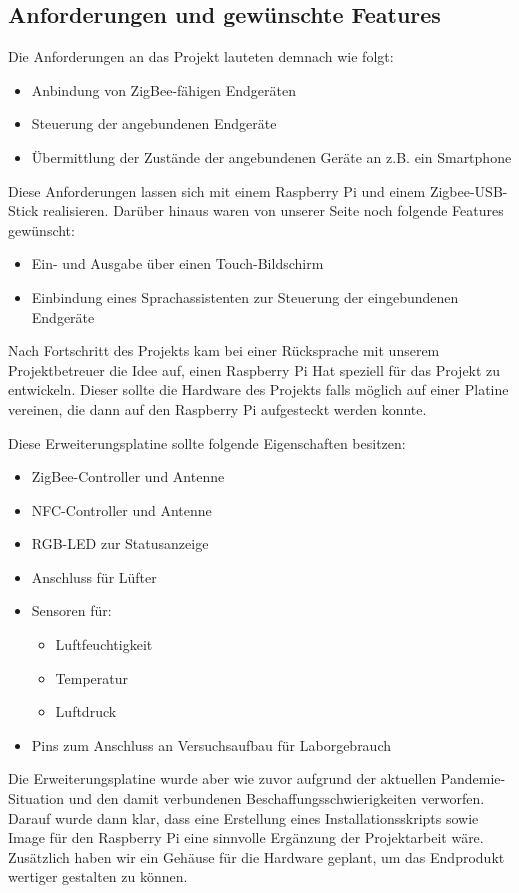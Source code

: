 \subsection{Anforderungen und gewünschte Features}\label{zs_anforderungen}
Die Anforderungen an das Projekt lauteten demnach wie folgt:
\begin{itemize}
	\item Anbindung von ZigBee-fähigen Endgeräten
	\item Steuerung der angebundenen Endgeräte
	\item Übermittlung der Zustände der angebundenen Geräte an z.B. ein Smartphone
\end{itemize}
Diese Anforderungen lassen sich mit einem Raspberry Pi und einem Zigbee-USB-Stick realisieren. Darüber hinaus waren von unserer Seite noch folgende Features gewünscht:
\begin{itemize}
	\item Ein- und Ausgabe über einen Touch-Bildschirm
	\item Einbindung eines Sprachassistenten zur Steuerung der eingebundenen Endgeräte
\end{itemize}
Nach Fortschritt des Projekts kam bei einer Rücksprache mit unserem Projektbetreuer die Idee auf, einen Raspberry Pi Hat speziell für das Projekt zu entwickeln. 
Dieser sollte die Hardware des Projekts falls möglich auf einer Platine vereinen, die dann auf den Raspberry Pi aufgesteckt werden konnte.\par
\noindent Diese Erweiterungsplatine sollte folgende Eigenschaften besitzen:
\begin{itemize}
	\item ZigBee-Controller und Antenne
	\item NFC-Controller und Antenne
	\item RGB-LED zur Statusanzeige
	\item Anschluss für Lüfter
	\item Sensoren für:
	\begin{itemize}
		 \item Luftfeuchtigkeit
		 \item Temperatur
		 \item Luftdruck
	\end{itemize}
	\item Pins zum Anschluss an Versuchsaufbau für Laborgebrauch
\end{itemize}
Die Erweiterungsplatine wurde aber wie zuvor aufgrund der aktuellen Pandemie-Situation und den damit verbundenen Beschaffungsschwierigkeiten verworfen.
Darauf wurde dann klar, dass eine Erstellung eines Installationsskripts sowie Image für den Raspberry Pi eine sinnvolle Ergänzung der Projektarbeit wäre.\\
\noindent Zusätzlich haben wir ein Gehäuse für die Hardware geplant, um das Endprodukt wertiger gestalten zu können.